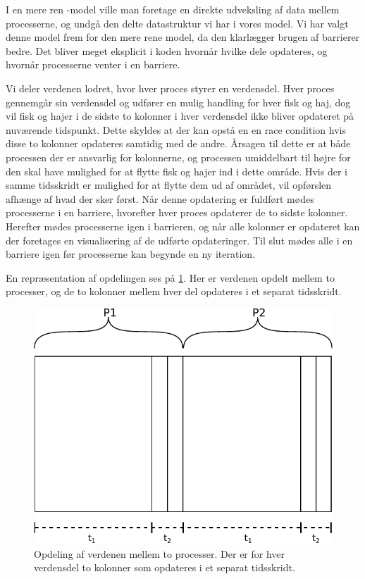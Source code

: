 I en mere ren \csp-model ville man foretage en direkte udveksling af data mellem 
processerne, og undgå den delte datastruktur vi har i vores model.  Vi har 
valgt denne model frem for den mere rene \csp model, da den klarlægger brugen af 
barrierer bedre.  Det bliver meget eksplicit i koden hvornår hvilke dele 
opdateres, og hvornår processerne venter i en barriere.

Vi deler verdenen lodret, hvor hver proces styrer en verdensdel. Hver proces 
gennemgår sin verdensdel og udfører en mulig handling for hver fisk og haj, dog 
vil fisk og hajer i de sidste to kolonner i hver verdensdel ikke bliver 
opdateret på nuværende tidspunkt. Dette skyldes at der kan opstå en en race 
condition hvis disse to kolonner opdateres samtidig med de andre. Årsagen til 
dette er at både processen der er ansvarlig for kolonnerne, og processen 
umiddelbart til højre for den skal have mulighed for at flytte fisk og hajer 
ind i dette område. Hvis der i samme tidsskridt er mulighed for at flytte dem 
ud af området, vil opførslen afhænge af hvad der sker først.  Når denne 
opdatering er fuldført mødes processerne i en barriere, hvorefter hver proces 
opdaterer de to sidste kolonner. Herefter mødes processerne igen i barrieren, 
og når alle kolonner er opdateret kan der foretages en visualisering af de 
udførte opdateringer. Til slut mødes alle i en barriere igen før processerne 
kan begynde en ny iteration.

En repræsentation af opdelingen ses på \cref{fig:wator}. Her er verdenen 
opdelt mellem to processer, og de to kolonner mellem hver del opdateres i et 
separat tidsskridt.  

\begin{figure}
 \begin{center}
  \includegraphics[scale=0.75]{images/wator}
  \caption{Opdeling af verdenen mellem to processer. Der er for hver verdensdel 
  to kolonner som opdateres i et separat tidsskridt.}
  \label{fig:wator}
  \end{center}
\end{figure}


